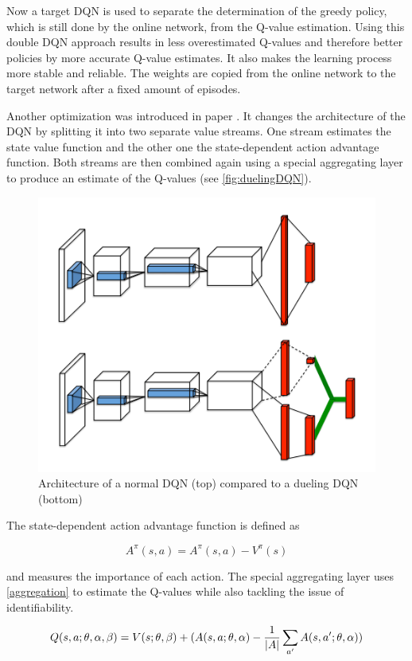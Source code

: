 Now a target DQN is used to separate the determination of the greedy policy, which is still done by the online network, from the Q-value estimation. Using this double DQN approach results in less overestimated Q-values and therefore better policies by more accurate Q-value estimates. It also makes the learning process more stable and reliable. The weights are copied from the online network to the target network after a fixed amount of episodes.

Another optimization was introduced in paper \cite{Wang2016}. It changes the architecture of the DQN by splitting it into two separate value streams. One stream estimates the state value function and the other one the state-dependent action advantage function. Both streams are then combined again using a special aggregating layer to produce an estimate of the Q-values (see \autoref{fig:duelingDQN}).  

\begin{figure}[ht]
	\centering
	\includegraphics[width=0.6\linewidth]{figures/duelingDQN.PNG}
	\caption{Architecture of a normal DQN (top) compared to a dueling DQN (bottom)}
	\label{fig:duelingDQN}
\end{figure}

The state-dependent action advantage function is defined as

\begin{equation} \label{advfunction}
	A^{\pi}(s,a) = A^{\pi}(s,a) - V^{\pi}(s)
\end{equation}

and measures the importance of each action. The special aggregating layer uses \autoref{aggregation} to estimate the Q-values while also tackling the issue of identifiability. 

\begin{equation} \label{aggregation}
	Q(s, a; \theta, \alpha, \beta) = V(s; \theta, \beta) + (A(s, a; \theta, \alpha) - \frac{1}{\lvert A\rvert} \sum_{a'}A(s, a'; \theta, \alpha)) 
\end{equation}

